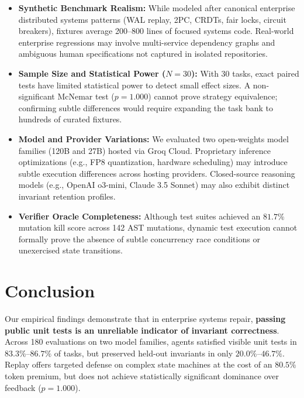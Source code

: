 \documentclass[10pt,twocolumn,letterpaper]{article}
\begin{document}
\begin{itemize}
    \item \textbf{Synthetic Benchmark Realism:} While modeled after canonical enterprise distributed systems patterns (WAL replay, 2PC, CRDTs, fair locks, circuit breakers), fixtures average 200--800 lines of focused systems code. Real-world enterprise regressions may involve multi-service dependency graphs and ambiguous human specifications not captured in isolated repositories.
    \item \textbf{Sample Size and Statistical Power ($N = 30$):} With 30 tasks, exact paired tests have limited statistical power to detect small effect sizes. A non-significant McNemar test ($p = 1.000$) cannot prove strategy equivalence; confirming subtle differences would require expanding the task bank to hundreds of curated fixtures.
    \item \textbf{Model and Provider Variations:} We evaluated two open-weights model families (120B and 27B) hosted via Groq Cloud. Proprietary inference optimizations (e.g., FP8 quantization, hardware scheduling) may introduce subtle execution differences across hosting providers. Closed-source reasoning models (e.g., OpenAI o3-mini, Claude 3.5 Sonnet) may also exhibit distinct invariant retention profiles.
    \item \textbf{Verifier Oracle Completeness:} Although test suites achieved an $81.7\%$ mutation kill score across 142 AST mutations, dynamic test execution cannot formally prove the absence of subtle concurrency race conditions or unexercised state transitions.
\end{itemize}

\section{Conclusion}

Our empirical findings demonstrate that in enterprise systems repair, \textbf{passing public unit tests is an unreliable indicator of invariant correctness}. Across 180 evaluations on two model families, agents satisfied visible unit tests in $83.3\%$--$86.7\%$ of tasks, but preserved held-out invariants in only $20.0\%$--$46.7\%$. Replay offers targeted defense on complex state machines at the cost of an $80.5\%$ token premium, but does not achieve statistically significant dominance over feedback ($p = 1.000$). 



\end{document}
